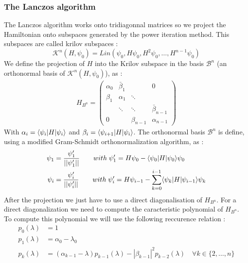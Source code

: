 \documentclass[1pt, a4paper]{article}
\begin{document}
\subsubsection{The Lanczos algorithm}
\label{subs:lanczos}
\noindent
The Lanczos algorithm works onto tridiagonnal matrices so we project the Hamiltonian onto subspaces generated by the power iteration method. This subspaces are called krilov subspaces :
\[\mathcal{K}^n(H, \psi_0) = Lin(\psi_0, H\psi_0, H^2\psi_0, \hdots, H^{n-1}\psi_0)\]
We define the projection of $H$ into the Krilov subspace in the basis $\mathcal{B}^n$ (an orthonormal basis of $\mathcal{K}^n(H, \psi_0)$), as :
\begin{equation}
    \begin{aligned}
        H_{B^n} = \begin{pmatrix}
                    \alpha_0 & \bar{\beta}_1 & & 0\\
                    \beta_1 & \alpha_1 & \ddots & \\
                        & \ddots & \ddots & \bar{\beta}_{n-1}\\
                    0 & & \beta_{n-1} & \alpha_{n-1}
                  \end{pmatrix}
    \end{aligned}
\end{equation}
With $\alpha_i = \Braket{\psi_i}{H}{\psi_i}$ and $\beta_i = \Braket{\psi_{i+1}}{H}{\psi_i}$. The orthonormal basis $\mathcal{B}^n$ is define, using a modified Gram-Schmidt orthonormalization algorithm, as :
\begin{equation}
    \begin{aligned}
        \psi_1 &= \dfrac{\psi_1'}{||\psi_1'||}\qquad with\;\psi_1'=H\psi_0-\Braket{\psi_0}{H}{\psi_0}\psi_0\\
        \psi_i &= \dfrac{\psi_i'}{||\psi_i'||}\qquad with\;\psi_i'=H\psi_{i-1}-\sum_{k=0}^{i-1}\Braket{\psi_k}{H}{\psi_{i-1}}\psi_k
    \end{aligned}
\end{equation}
After the projection we just have to use a direct diagonalisation of $H_{B^n}$. For a direct diagonalization we need to compute the caracteristic polynomial of $H_{B^n}$. To compute this polynomial we will use the following reccurence relation :
\begin{equation}
    \begin{aligned}
        p_0(\lambda) &= 1\\
        p_1(\lambda) &= \alpha_0-\lambda_0\\
        p_k(\lambda) &= (\alpha_{k-1}-\lambda)p_{k-1}(\lambda)-|\beta_{k-1}|^2p_{k-2}(\lambda)\quad\forall k\in\{2,\hdots,n\}
    \end{aligned}
\end{equation}
\end{document}
